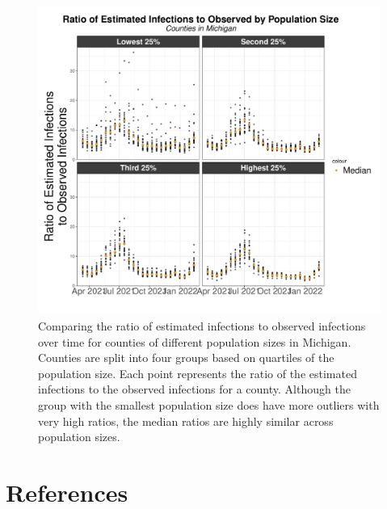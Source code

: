\documentclass[12pt,twoside]{smiththesis}
\begin{document}
\begin{figure}

{\centering \includegraphics[width=1\linewidth]{figure/mi-ratio-pop} 

}

\caption{\label{fig:mi-ratio-pop}Comparing the ratio of estimated infections to observed infections over time for counties of different population sizes in Michigan. Counties are split into four groups based on quartiles of the population size. Each point represents the ratio of the estimated infections to the observed infections for a county. Although the group with the smallest population size does have more outliers with very high ratios, the median ratios are highly similar across population sizes.}\label{fig:unnamed-chunk-122}
\end{figure}
\backmatter

\hypertarget{references}{%
\chapter*{References}\label{references}}


\noindent

\setlength{\parindent}{-0.20in}
\setlength{\leftskip}{0.20in}
\setlength{\parskip}{8pt}
\end{document}
